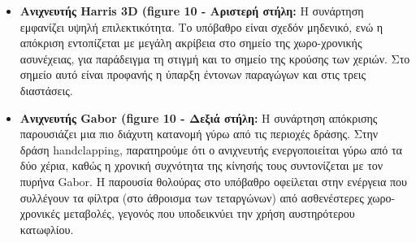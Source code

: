 \documentclass[12pt]{article}
\begin{document}
\begin{itemize}

    \item \textbf{Ανιχνευτής Harris 3D (figure 10 - Αριστερή στήλη:} Η συνάρτηση εμφανίζει υψηλή επιλεκτικότητα. Το υπόβαθρο είναι σχεδόν μηδενικό, ενώ η απόκριση εντοπίζεται με μεγάλη ακρίβεια στο σημείο της χωρο-χρονικής ασυνέχειας, για παράδειγμα τη στιγμή και το σημείο της κρούσης των χεριών. Στο σημείο αυτό είναι προφανής η ύπαρξη έντονων παραγώγων και στις τρεις διαστάσεις.
 
    \item \textbf{Ανιχνευτής Gabor (figure 10 - Δεξιά στήλη:} Η συνάρτηση απόκρισης παρουσιάζει μια πιο διάχυτη κατανομή γύρω από τις περιοχές δράσης. Στην δράση handclapping, παρατηρούμε ότι ο ανιχνευτής ενεργοποιείται γύρω από τα δύο χέρια, καθώς η χρονική συχνότητα της κίνησής τους συντονίζεται με τον πυρήνα Gabor. Η παρουσία θολούρας στο υπόβαθρο οφείλεται στην ενέργεια που συλλέγουν τα φίλτρα (στο άθροισμα των τεταργώνων) από ασθενέστερες χωρο-χρονικές μεταβολές, γεγονός που υποδεικνύει την χρήση αυστηρότερου κατωφλίου.
    
\end{itemize}
\end{document}
